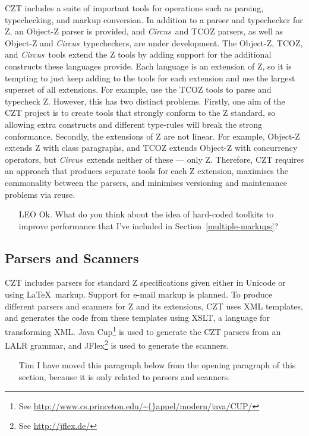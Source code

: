 \documentclass{llncs}
\newcommand{\Circus}{{\sf\slshape Circus}}
\begin{document}
  CZT includes a suite of important tools for operations such as
  parsing, typechecking, and markup conversion. In addition to a
  parser and typechecker for Z, an Object-Z parser is provided, and
  \Circus\ and TCOZ parsers, as well as Object-Z and \Circus\
  typecheckers, are under development.  The Object-Z, TCOZ, and
  \Circus\ tools extend the Z tools by adding support for the
  additional constructs these languages provide.  Each language is an
  extension of Z, so it is tempting to just keep adding to the tools
  for each extension and use the largest superset of all extensions. For
  example, use the TCOZ tools to parse and typecheck Z. However, this
  has two distinct problems. Firstly, one aim of the CZT project is to
  create tools that strongly conform to the Z standard, so allowing
  extra constructs and different type-rules will break the strong
  conformance. Secondly, the extensions of Z are not linear. For
  example, Object-Z extends Z with class paragraphs, and TCOZ extends
  Object-Z with concurrency operators, but \Circus\ extends neither of
  these --- only Z. Therefore, CZT requires an approach that produces
  separate tools for each Z extension, maximises the commonality between
  the parsers, and minimises versioning and maintenance problems via
  reuse.


  \begin{itemize}
    \item[LEO] Ok. What do you think about the idea of hard-coded toolkits to
               improve performance that I've included in Section~\ref{multiple-markups}?
  \end{itemize}

\subsection{Parsers and Scanners}

  CZT includes parsers for standard Z specifications given either in
  Unicode or using \LaTeX\ markup.  Support for e-mail markup is
  planned. To produce different parsers and scanners for Z and its
  extensions, CZT uses XML templates, and generates the code from these
  templates using XSLT, a language for transforming XML. Java
  Cup\footnote{See
  \url{http://www.cs.princeton.edu/\~{}appel/modern/java/CUP/}} is
  used to generate the CZT parsers from an LALR grammar, and
  JFlex\footnote{See \url{http://jflex.de/}} is used to generate the
  scanners. 

  \begin{itemize}
    \item[Tim] I have moved this paragraph below from the opening
    paragraph of this section, because it is only related to parsers
    and scanners.
  \end{itemize}
\end{document}
